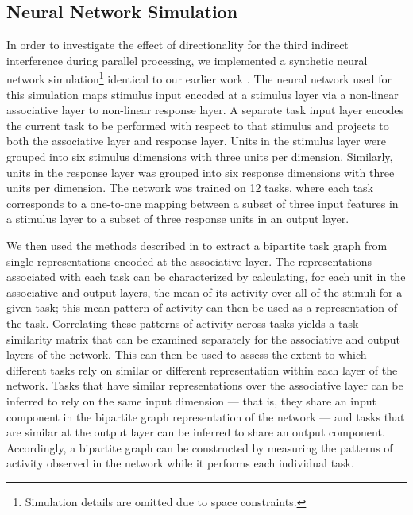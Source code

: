 \documentclass[10pt,letterpaper]{article}
\begin{document}
\subsection{Neural Network Simulation}
%
%
In order to investigate the effect of directionality for the third indirect interference during parallel processing, we implemented a synthetic neural network simulation\footnote{Simulation details are omitted due to space constraints.} identical to our earlier work \cite{CogSci_2016}. The neural network used for this simulation maps stimulus input encoded at a stimulus layer via a non-linear associative layer to  non-linear response layer. A separate task input layer encodes the current task to be performed with respect to that stimulus and projects to both the associative layer and response layer.  Units in the stimulus layer were grouped into six stimulus dimensions with three units per dimension. Similarly, units in the response layer was grouped into six response dimensions with three units per dimension. The network was trained on 12 tasks, where each task corresponds to a one-to-one mapping between a subset of three input features in a stimulus layer to a subset of three response units in an output layer. 

We then used the methods described in  to extract a bipartite task graph from single representations encoded at the associative layer. The representations associated with each task can be characterized by calculating, for each unit in the associative and output layers, the mean of its activity over all of the stimuli for a given task;  this mean pattern of activity can then be used as a representation of the task. Correlating these patterns of activity across tasks yields a task similarity matrix that can be examined separately for the associative and output layers of the network.  This can then be used to assess the extent to which different tasks rely on similar or different representation within each layer of the network. Tasks that have similar representations over the associative layer can be inferred to rely on the same input dimension — that is, they share an input component in the bipartite graph representation of the network — and tasks that are similar at the output layer can be inferred to share an output component.  Accordingly, a bipartite graph can be constructed by measuring the patterns of activity observed in the network while it performs each individual task. 
\end{document}
